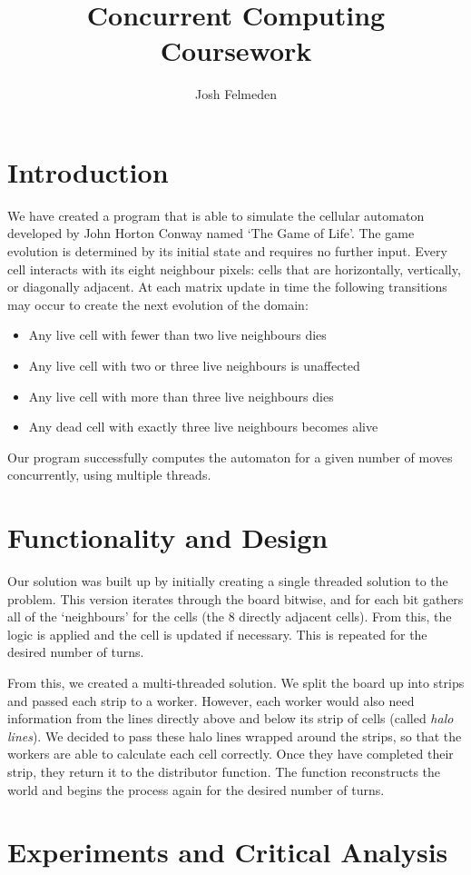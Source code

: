 \documentclass[11pt,a4paper,twocolumn,dvipsnames,cmyk]{scrartcl}
\title{Concurrent Computing Coursework}
\author{Josh Felmeden}
\begin{document}
\section*{Introduction}%
\label{sec:Introduction}
We have created a program that is able to simulate the cellular automaton
developed by John Horton Conway named `The Game of Life'. The game evolution is determined by its initial state and requires no further input. Every cell interacts with its eight neighbour pixels: cells that are horizontally, vertically, or diagonally adjacent. At each matrix update in time the following transitions may occur to create the next evolution of the domain:

\begin{itemize}
    \item Any live cell with fewer than two live neighbours dies
    \item Any live cell with two or three live neighbours is unaffected
    \item Any live cell with more than three live neighbours dies
    \item Any dead cell with exactly three live neighbours becomes alive
\end{itemize}

Our program successfully computes the automaton for a given number of
moves concurrently, using multiple threads.

\section*{Functionality and Design}%
\label{sec:func-and-design}
Our solution was built up by initially creating a single threaded solution
to the problem. This version iterates through the board bitwise, and for
each bit gathers all of the `neighbours' for the cells (the 8 directly
adjacent cells). From this, the logic is applied and the cell is updated
if necessary. This is repeated for the desired number of turns.

From this, we created a multi-threaded solution. We split the board up
into strips and passed each strip to a worker. However, each worker would
also need information from the lines directly above and below its strip of
cells (called \textit{halo lines}). We decided to pass these halo lines
wrapped around the strips, so that the workers are able to calculate each
cell correctly. Once they have completed their strip, they return it to
the distributor function. The function reconstructs the world and begins
the process again for the desired number of turns.

\section*{Experiments and Critical Analysis}%
\label{sec:Experiments and Critical Analysis}
\end{document}
